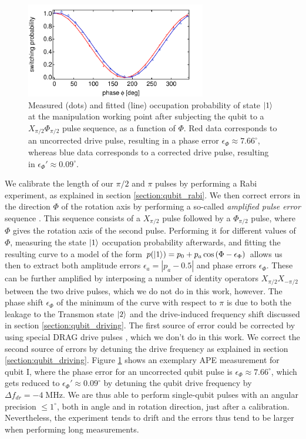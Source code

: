 \smallskip

\begin{figure}
	\centering
	\includegraphics[width=0.7\textwidth]{./data/phase_error_analysis}
	\caption{Measured (dots) and fitted (line) occupation probability of state $\left| 1 \right>$ at the manipulation working point after subjecting the qubit to a $X_{\pi/2}\Phi_{\pi/2}$ pulse sequence, as a function of $\Phi$. Red data corresponds to an uncorrected drive pulse, resulting in a phase error $\epsilon_\Phi\approx 7.66^\circ$, whereas blue data corresponds to a corrected drive pulse, resulting in $\epsilon_\Phi' \approx 0.09^\circ$.}
	\label{fig:ape}
\end{figure}

We calibrate the length of our $\pi/2$ and $\pi$ pulses by performing a Rabi experiment, as explained in section \ref{section:qubit_rabi}. We then correct errors in the direction $\Phi$ of the rotation axis by performing a so-called {\it amplified pulse error} sequence \citep{lucero_reduced_2010}. This sequence consists of a $X_{\pi/2}$ pulse followed by a $\Phi_{\pi/2}$ pulse, where $\Phi$ gives the rotation axis of the second pulse. Performing it for different values of $\Phi$, measuring the state $\left| 1 \right>$ occupation probability afterwards, and fitting the resulting curve to a model of the form $p(\left| 1 \right>) = p_0+p_a\cos{(\Phi-\epsilon_\Phi)}$ allows us then to extract both amplitude errors $\epsilon_a=|p_a-0.5|$ and phase errors $\epsilon_\Phi$. These can be further amplified by interposing a number of identity operators $X_{\pi/2}X_{-\pi/2}$ between the two drive pulses, which we do not do in this work, however. The phase shift $\epsilon_\Phi$ of the minimum of the curve with respect to $\pi$ is due to both the leakage to the Transmon state $\left| 2 \right>$ and the drive-induced frequency shift discussed in section \ref{section:qubit_driving}. The first source of error could be corrected by using special DRAG drive pulses \citep{lucero_reduced_2010}, which we don't do in this work. We correct the second source of errors by detuning the drive frequency as explained in section \ref{section:qubit_driving}. Figure \ref{fig:ape} shows an exemplary APE measurement for qubit I, where the phase error for an uncorrected qubit pulse is $\epsilon_\Phi\approx 7.66^\circ$, which gets reduced to $\epsilon_\Phi'\approx 0.09^\circ$ by detuning the qubit drive frequency by $\Delta f_{dr}=-4\;\mathrm{MHz}$. We are thus able to perform single-qubit pulses with an angular precision $\le 1^\circ$, both in angle and in rotation direction, just after a calibration. Nevertheless, the experiment tends to drift and the errors thus tend to be larger when performing long measurements.


